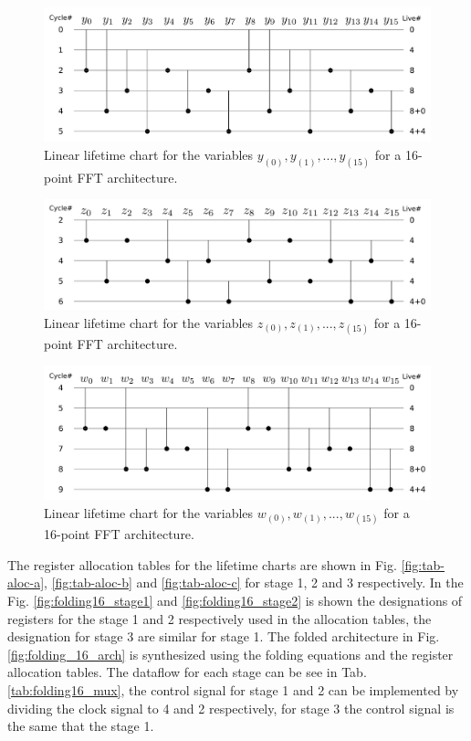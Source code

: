 \documentclass[journal,comsoc]{IEEEtran}
\begin{document}
\begin{figure}[t!]
\centering
 \includegraphics[width=\linewidth]{Diagramas/life_chart_a.png}
\caption{Linear lifetime chart for the variables $y_{(0)}, y_{(1)},...,y_{(15)}$ for a 16-point FFT architecture.}
\label{fig:tab-life-a}
\end{figure}
\begin{figure}[t!]
\centering
 \includegraphics[width=\linewidth]{Diagramas/life_chart_b.png}
\caption{Linear lifetime chart for the variables $z_{(0)}, z_{(1)},...,z_{(15)}$ for a 16-point FFT architecture.}
\label{fig:tab-life-b}
\end{figure}
\begin{figure}[t!]
\centering
 \includegraphics[width=\linewidth]{Diagramas/life_chart_c.png}
\caption{Linear lifetime chart for the variables $w_{(0)}, w_{(1)},...,w_{(15)}$ for a 16-point FFT architecture.}
\label{fig:tab-life-c}
\end{figure}

The register allocation tables for the lifetime charts are shown in Fig. \ref{fig:tab-aloc-a}, \ref{fig:tab-aloc-b} and \ref{fig:tab-aloc-c} for stage 1, 2 and 3 respectively. In the Fig. \ref{fig:folding16_stage1} and \ref{fig:folding16_stage2} is shown the designations of registers for the stage 1 and 2 respectively used in the allocation tables, the designation for stage 3 are similar for stage 1. The folded architecture in Fig. \ref{fig:folding_16_arch} is synthesized using the folding equations and the register allocation tables. The dataflow for each stage can be see in Tab. \ref{tab:folding16_mux}, the control signal for stage 1 and 2 can be implemented by dividing the clock signal to 4 and 2 respectively, for stage 3 the control signal is the same that the stage 1.
\end{document}
